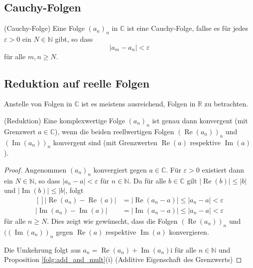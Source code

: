 \documentclass[../Analysis1_script.tex]{subfiles}
\begin{document}
\subsection{Cauchy-Folgen}

\begin{definition}{(Cauchy-Folge)}
	Eine Folge $(a_n)_n$ in $\mathbb{C}$ ist eine Cauchy-Folge, fallse es für jedes $\varepsilon > 0$ ein $N \in \mathbb{N}$ gibt, so dass
	\[|a_m - a_n| < \varepsilon\]
	für alle $m, n \geq N$.
\end{definition}

\subsection{Reduktion auf reelle Folgen}

Anstelle von Folgen in $\mathbb{C}$ ist es meistens ausreichend, Folgen in $\mathbb{R}$ zu betrachten.

\begin{lemma}{(Reduktion})
	Eine komplexwertige Folge $(a_n)_n$ ist genau dann konvergent (mit Grenzwert $a\in \mathbb {C}$), wenn die beiden reellwertigen Folgen $(\operatorname {Re}(a_n))_n$ und $(\operatorname {Im}(a_n))_n$ konvergent sind (mit Grenzwerten $\operatorname {Re}(a)$ respektive $\operatorname {Im}(a)$). 
\end{lemma}

\begin{proof}
	Angenommen $(a_n)_n$ konvergiert gegen $a\in \mathbb {C}$. Für $\varepsilon >0$ existiert dann ein $N \in \mathbb {N}$, so dass $|a_n-a|< \varepsilon$ für $n\in \mathbb {N}$. Da für alle $b\in \mathbb {C}$ gilt $|\operatorname {Re}(b)| \leq |b|$ und $|\operatorname {Im}(b)| \leq |b|$, folgt
	\[\begin{aligned}[]
		|\operatorname {Re}(a_n)-\operatorname {Re}(a)| &= |\operatorname {Re}(a_n-a)| \leq |a_n -a| < \varepsilon \\ |\operatorname {Im}(a_n)-\operatorname {Im}(a)| &= |\operatorname {Im}(a_n-a)| \leq |a_n -a| < \varepsilon
	\end{aligned}\]
	für alle $n \geq N$. Dies zeigt wie gewünscht, dass die Folgen $(\operatorname {Re}(a_n))_n$ und $((\operatorname {Im}(a_n))_n$ gegen $\operatorname {Re}(a)$ respektive $\operatorname {Im}(a)$ konvergieren.
	
	Die Umkehrung folgt aus $a_n = \operatorname {Re}(a_n) + \operatorname {Im}(a_n)\mathrm {i}$ für alle $n\in \mathbb {N}$ und Proposition \ref{folg:add_and_mult}(i) (Additive Eigenschaft des Grenzwerts) 	
\end{proof}
\end{document}
